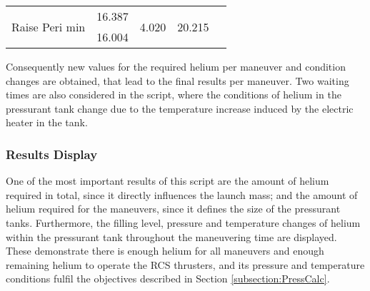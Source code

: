 \begin{table}[H]
{\begin{tabular}{|l|r|r|r|l}
\cline{1-4}
\multirow{2}{*}{Raise Peri min}                                      & 16.387                                                                                                                                                                               & \multirow{2}{*}{4.020}                                                                                                                                                                            & \multirow{2}{*}{20.215}                                                                                                                                                                            & \multirow{2}{*}{}  \\
                                                                     & 16.004                                                                                                                                                                               &                                                                                                                                                                                                   &                                                                                                                                                                                                    &                    \\
\cline{1-4}
\end{tabular}
}
\end{table}

Consequently new values for the required helium per maneuver and condition changes are obtained, that lead to the final results per maneuver.
Two waiting times are also considered in the script, where the conditions of helium in the pressurant tank change due to the temperature increase induced by the electric heater in the tank.
\subsubsection{Results Display}
One of the most important results of this script are the amount of helium required in total, since it directly influences the launch mass; and the amount of helium required for the maneuvers, since it defines the size of the pressurant tanks.
Furthermore, the filling level, pressure and temperature changes of helium within the pressurant tank throughout the maneuvering time are displayed. These demonstrate there is enough helium for all maneuvers and enough remaining helium to operate the RCS thrusters, and its pressure and temperature conditions fulfil the objectives described in Section \ref{subsection:PressCalc}.  









